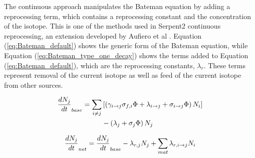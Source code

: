 The continuous approach manipulates the Bateman equation by adding a reprocessing term, which contains a reprocessing constant and the concentration of the isotope. This is one of the methods used in Serpent2 continuous reprocessing, an extension developed by Aufiero et al \cite{aufiero_extended_2013}. Equation (\ref{eq:Bateman_default}) shows the generic form of the Bateman equation, while Equation (\ref{eq:Bateman_type_one_decay}) shows the terms added to Equation (\ref{eq:Bateman_default}), which are the reprocessing constants, $\lambda_{r}$. These terms represent removal of the current isotope as well as feed of the current isotope from other sources.

\begin{equation} \hfill
\begin{split}
\frac{dN_j}{dt}_{base} = \sum_{i \neq j}  & \left [ \left( \gamma_{i \rightarrow j} \sigma_{f, i} \Phi + \lambda _{i \rightarrow j} + \sigma_{i \rightarrow j} \Phi \right) N_i \right ]\\
 & - \left ( \lambda_j + \sigma_j \Phi \right ) N_j
\end{split}
\hfill\label{eq:Bateman_default} \end{equation}

\begin{equation} \hfill
\frac{dN_j}{dt}_{net} = \frac{dN_j}{dt}_{base} -  \lambda_{r, j} N_j + \sum_{mat} \lambda _{r, i \rightarrow j} N_i
\hfill\label{eq:Bateman_type_one_decay} \end{equation}

